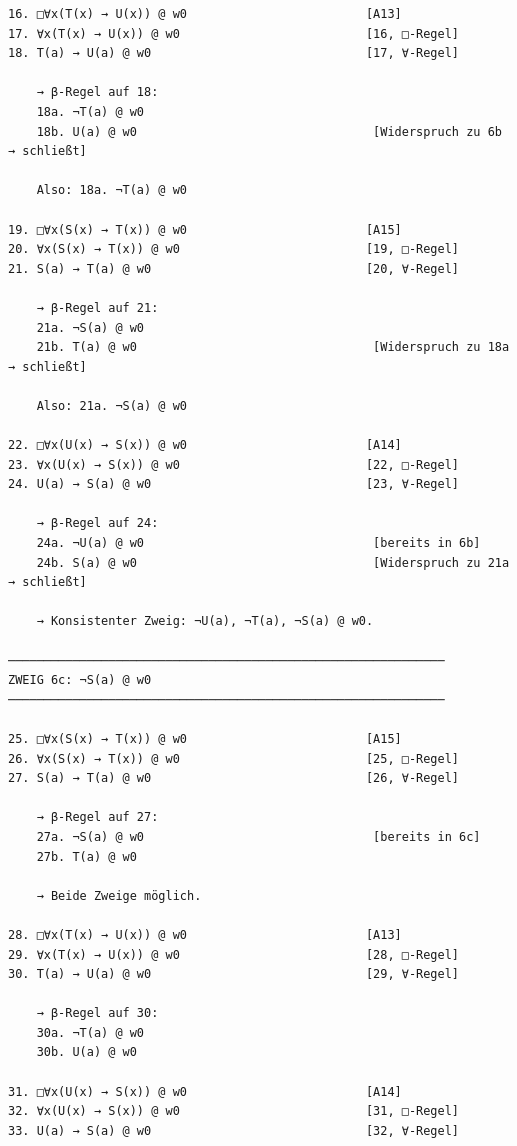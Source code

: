 \documentclass[
]{article}
\begin{document}
\begin{verbatim}
16. □∀x(T(x) → U(x)) @ w0                         [A13]
17. ∀x(T(x) → U(x)) @ w0                          [16, □-Regel]
18. T(a) → U(a) @ w0                              [17, ∀-Regel]

    → β-Regel auf 18:
    18a. ¬T(a) @ w0
    18b. U(a) @ w0                                 [Widerspruch zu 6b → schließt]

    Also: 18a. ¬T(a) @ w0

19. □∀x(S(x) → T(x)) @ w0                         [A15]
20. ∀x(S(x) → T(x)) @ w0                          [19, □-Regel]
21. S(a) → T(a) @ w0                              [20, ∀-Regel]

    → β-Regel auf 21:
    21a. ¬S(a) @ w0
    21b. T(a) @ w0                                 [Widerspruch zu 18a → schließt]

    Also: 21a. ¬S(a) @ w0

22. □∀x(U(x) → S(x)) @ w0                         [A14]
23. ∀x(U(x) → S(x)) @ w0                          [22, □-Regel]
24. U(a) → S(a) @ w0                              [23, ∀-Regel]

    → β-Regel auf 24:
    24a. ¬U(a) @ w0                                [bereits in 6b]
    24b. S(a) @ w0                                 [Widerspruch zu 21a → schließt]

    → Konsistenter Zweig: ¬U(a), ¬T(a), ¬S(a) @ w0.

─────────────────────────────────────────────────────────────
ZWEIG 6c: ¬S(a) @ w0
─────────────────────────────────────────────────────────────

25. □∀x(S(x) → T(x)) @ w0                         [A15]
26. ∀x(S(x) → T(x)) @ w0                          [25, □-Regel]
27. S(a) → T(a) @ w0                              [26, ∀-Regel]

    → β-Regel auf 27:
    27a. ¬S(a) @ w0                                [bereits in 6c]
    27b. T(a) @ w0

    → Beide Zweige möglich.

28. □∀x(T(x) → U(x)) @ w0                         [A13]
29. ∀x(T(x) → U(x)) @ w0                          [28, □-Regel]
30. T(a) → U(a) @ w0                              [29, ∀-Regel]

    → β-Regel auf 30:
    30a. ¬T(a) @ w0
    30b. U(a) @ w0

31. □∀x(U(x) → S(x)) @ w0                         [A14]
32. ∀x(U(x) → S(x)) @ w0                          [31, □-Regel]
33. U(a) → S(a) @ w0                              [32, ∀-Regel]


\end{verbatim}
\end{document}
